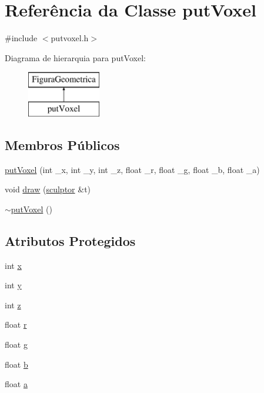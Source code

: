 \hypertarget{classput_voxel}{}\section{Referência da Classe put\+Voxel}
\label{classput_voxel}


{\ttfamily \#include $<$putvoxel.\+h$>$}

Diagrama de hierarquia para put\+Voxel\+:\begin{figure}[H]
\begin{center}
\leavevmode
\includegraphics[height=2.000000cm]{classput_voxel}
\end{center}
\end{figure}
\subsection*{Membros Públicos}
\begin{DoxyCompactItemize}
\item 
\mbox{\hyperlink{classput_voxel_a75a1aca9311cf59323bbccc1bd46febb}{put\+Voxel}} (int \+\_\+x, int \+\_\+y, int \+\_\+z, float \+\_\+r, float \+\_\+g, float \+\_\+b, float \+\_\+a)
\item 
void \mbox{\hyperlink{classput_voxel_ab0be1f883d42ede6169d3d08ee09b9ac}{draw}} (\mbox{\hyperlink{classsculptor}{sculptor}} \&t)
\item 
\mbox{\hyperlink{classput_voxel_a4e2f82887ec1c1d88bf7905a0ea19f68}{$\sim$put\+Voxel}} ()
\end{DoxyCompactItemize}
\subsection*{Atributos Protegidos}
\begin{DoxyCompactItemize}
\item 
int \mbox{\hyperlink{classput_voxel_a8b552cecf4a6e135feabb07f0f06377b}{x}}
\item 
int \mbox{\hyperlink{classput_voxel_a6213499245f21f8d815d21edb2e4544b}{y}}
\item 
int \mbox{\hyperlink{classput_voxel_a5662d2dce87f60fb8df112dfda270a21}{z}}
\item 
float \mbox{\hyperlink{classput_voxel_ad01cffb7ebc40ddf2414d1010140346d}{r}}
\item 
float \mbox{\hyperlink{classput_voxel_a4de99a611360389b92c74cf7062e390f}{g}}
\item 
float \mbox{\hyperlink{classput_voxel_a00043f2fa81ac4fd7ba2a700682980e3}{b}}
\item 
float \mbox{\hyperlink{classput_voxel_a67d2e528534239edfa099f622d08f9ca}{a}}
\end{DoxyCompactItemize}


